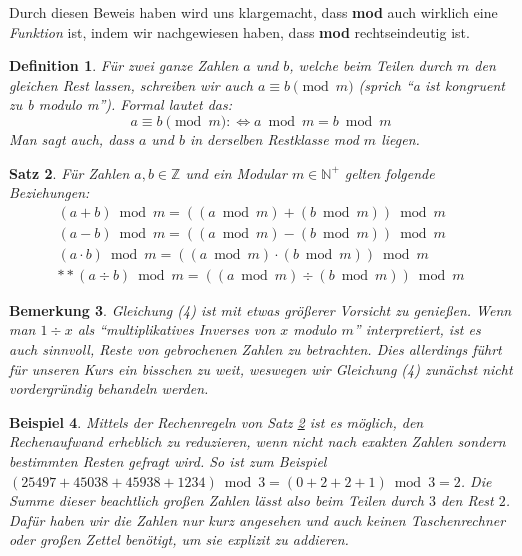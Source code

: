 \documentclass[a4paper]{article}
\newtheorem{satz}{Satz}[section] %
\newtheorem{beispiel}[satz]{Beispiel}
\newtheorem{bemerkung}[satz]{Bemerkung}
\newtheorem{definition}[satz]{Definition} %
\theoremstyle{nonumberplain}
\begin{document}
Durch diesen Beweis haben wird uns klargemacht, dass \textbf{mod} auch wirklich eine \textit{Funktion} ist, indem wir nachgewiesen haben, dass \textbf{mod} rechtseindeutig ist.

\begin{definition}
Für zwei ganze Zahlen $a$ und $b$, welche beim Teilen durch $m$ den gleichen Rest lassen, schreiben wir auch $a \equiv b \pmod{m}$ (sprich "`a ist kongruent zu b modulo m"'). Formal lautet das:
\[
a \equiv b \pmod{m} :\Leftrightarrow a \bmod m = b \bmod m
\]
Man sagt auch, dass $a$ und $b$ in derselben Restklasse mod $m$ liegen.
\end{definition}

\begin{satz}\label{s:mod}
Für Zahlen $a,b \in \mathbb{Z}$ und ein Modular $m \in \mathbb{N}^+$ gelten folgende Beziehungen:\\
\begin{align}
(a + b) \bmod m = ((a \bmod m) + (b \bmod m)) \bmod m\\
(a - b) \bmod m = ((a \bmod m) - (b \bmod m)) \bmod m\\
(a \cdot b) \bmod m = ((a \bmod m) \cdot (b \bmod m)) \bmod m\\
**(a \div b) \bmod m = ((a \bmod m) \div (b \bmod m)) \bmod m
\end{align}
\end{satz}

\begin{bemerkung}
Gleichung (4) ist mit etwas größerer Vorsicht zu genießen. Wenn man $1 \div x$ als "`multiplikatives Inverses von $x$ modulo $m$"' interpretiert, ist es auch sinnvoll, Reste von gebrochenen Zahlen zu betrachten. Dies allerdings führt für unseren Kurs ein bisschen zu weit, weswegen wir Gleichung (4) zunächst nicht vordergründig behandeln werden.
\end{bemerkung}

\begin{beispiel}
Mittels der Rechenregeln von Satz \ref{s:mod} ist es möglich, den Rechenaufwand erheblich zu reduzieren, wenn nicht nach exakten Zahlen sondern bestimmten Resten gefragt wird. So ist zum Beispiel $(25497 + 45038 + 45938 + 1234) \bmod 3 = (0 + 2 + 2 + 1) \bmod 3 = 2$. Die Summe dieser beachtlich großen Zahlen lässt also beim Teilen durch $3$ den Rest $2$. Dafür haben wir die Zahlen nur kurz angesehen und auch keinen Taschenrechner oder großen Zettel benötigt, um sie explizit zu addieren.
\end{beispiel}
\end{document}
